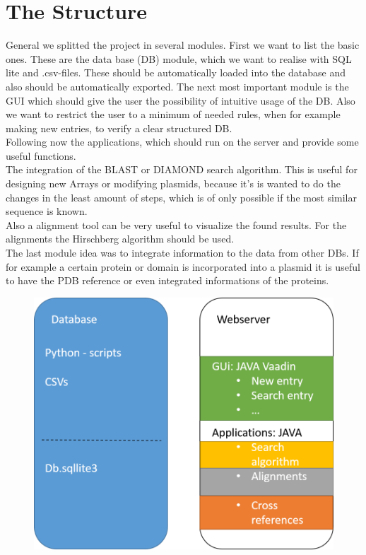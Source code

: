 \documentclass[]{article}
\begin{document}
\section{ The Structure}
General we splitted the project in several modules. First we want to list the basic ones. These are the data base (DB) module, which we want to realise with SQL lite and .csv-files. These should be automatically loaded into the database and also should be automatically exported.
The next most important module is the GUI which should give the user the possibility of intuitive usage of the DB. Also we want to restrict the user to a minimum of needed rules, when for example making new entries, to verify a clear structured DB.\\
Following now the applications, which should run on the server and provide some useful functions.\\
The integration of the BLAST or DIAMOND search algorithm. This is useful for designing new Arrays or modifying plasmids, because it's is wanted to do the changes in the least amount of steps, which is of only possible if the most similar sequence is known.\\
Also a alignment tool can be very useful to visualize the found results. For the alignments the Hirschberg algorithm should be used.\\
The last module idea was to integrate information to the data from other DBs. If for example a certain protein or domain is incorporated into a plasmid it is useful to have the PDB reference or even integrated informations of the proteins.
	\begin{figure}[h]
		\includegraphics[scale=0.5]{img/Structure.png}
	\end{figure}
\end{document}

